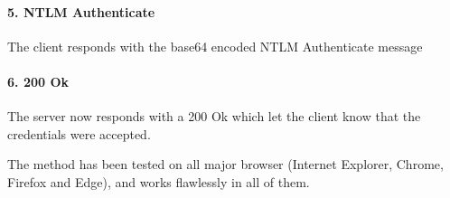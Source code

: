 \documentclass{article}
\begin{document}
\paragraph{5. NTLM Authenticate} The client responds with the base64 encoded NTLM Authenticate message
\paragraph{6. 200 Ok} The server now responds with a 200 Ok which let the client know that the credentials were accepted.

The method has been tested on all major browser (Internet Explorer, Chrome, Firefox and Edge), and works flawlessly in all of them.
\end{document}
